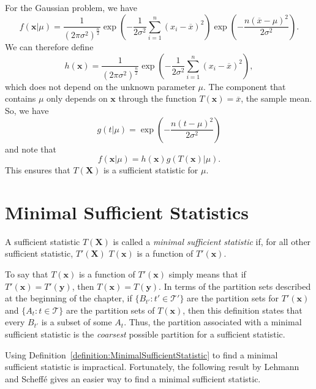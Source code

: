 For the Gaussian problem, we have
\begin{equation*}
f(\mathbf{x}|\mu) = \frac{1}{(2 \pi \sigma^2)^{\frac{n}{2}}}
\exp \left( - \frac{1}{2 \sigma^2} \sum_{i=1}^n (x_i - \overline{x})^2 \right)
\exp \left( - \frac{n (\overline{x} - \mu)^2 }{2 \sigma^2} \right) .
\end{equation*}
We can therefore define
\begin{equation*}
h(\mathbf{x}) = \frac{1}{(2 \pi \sigma^2)^{\frac{n}{2}}}
\exp \left( - \frac{1}{2 \sigma^2} \sum_{i=1}^n (x_i - \overline{x})^2 \right) ,
\end{equation*}
which does not depend on the unknown parameter $\mu$.
The component that contains $\mu$ only depends on $\mathbf{x}$ through the function $T(\mathbf{x}) = \overline{x}$, the sample mean.
So, we have
\begin{equation*}
g(t|\mu) = \exp \left( - \frac{n (t - \mu)^2 }{2 \sigma^2} \right)
\end{equation*}
and note that
\begin{equation*}
f(\mathbf{x}|\mu) = h(\mathbf{x}) g(T(\mathbf{x})|\mu) .
\end{equation*}
This ensures that $T(\mathbf{X})$ is a sufficient statistic for $\mu$.


\section{Minimal Sufficient Statistics}

\begin{definition} \label{definition:MinimalSufficientStatistic}
A sufficient statistic $T(\mathbf{X})$ is called a \emph{minimal sufficient statistic} if, for all other sufficient statistic, $T'(\mathbf{X})$ $T(\mathbf{x})$ is a function of $T'(\mathbf{x})$.
\end{definition}

To say that $T(\mathbf{x})$ is a function of $T'(\mathbf{x})$ simply means that if $T'(\mathbf{x}) = T'(\mathbf{y})$, then $T(\mathbf{x}) = T(\mathbf{y})$.
In terms of the partition sets described at the beginning of the chapter, if $\{ B_{t'}:t' \in \mathcal{T}'\}$ are the partition sets for $T'(\mathbf{x})$ and $\{ A_t : t \in \mathcal{T} \}$ are the partition sets of $T(\mathbf{x})$, then this definition states that every $B_{t'}$ is a subset of some $A_{t}$.
Thus, the partition associated with a minimal sufficient statistic is the \emph{coarsest} possible partition for a sufficient statistic.


Using Definition~\ref{definition:MinimalSufficientStatistic} to find a minimal sufficient statistic is impractical.
Fortunately, the following result by Lehmann and Scheff\'{e} gives an easier way to find a minimal sufficient statistic.


